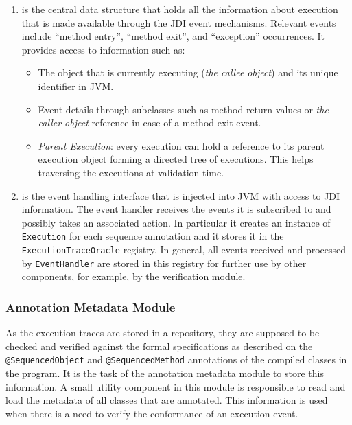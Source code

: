 \begin{enumerate}
  \item {} is the central data structure that holds all the
  information about execution that is made available through the JDI event mechanisms.
  Relevant events include ``method entry'', ``method  exit'', and
``exception'' occurrences.
   It provides access to information such as:
   \begin{itemize}
     \item The object that is currently executing (\emph{the callee object}) and
     its unique identifier in JVM.
     \item Event details through subclasses such as method return values or
     \emph{the caller object} reference in case of a method exit event.
     \item \textit{Parent Execution}: every execution can hold a reference to its
     parent execution object forming a directed tree of executions. This helps
     traversing the executions at validation time.
    \end{itemize}
     \item {} is the event handling interface that
is
     injected into JVM with access to JDI information. The event handler
     receives the events it is subscribed to and possibly takes an associated
     action. In particular it creates an instance of {\small\texttt{Execution}}
     for each sequence annotation and it stores it in the
     {\small\texttt{ExecutionTraceOracle}} registry. In general, all events received and processed by
     {\small\texttt{EventHandler}} are stored in this registry for further use
     by other components, for example, by the
     verification module.
\end{enumerate}

\subsubsection{Annotation Metadata Module} \label{sec:annotation_repo}

As the execution traces are stored in a repository, they are supposed to be
checked and verified against the formal specifications as described on the
{\small\texttt{@SequencedObject}} and {\small\texttt{@SequencedMethod}} annotations
of the compiled classes in the program. It is the task of the
annotation metadata module to store this information. A small utility
component in this module is responsible to read and load the metadata of all
classes that are annotated. This information is used when there is a
need to verify the conformance of an execution event.

